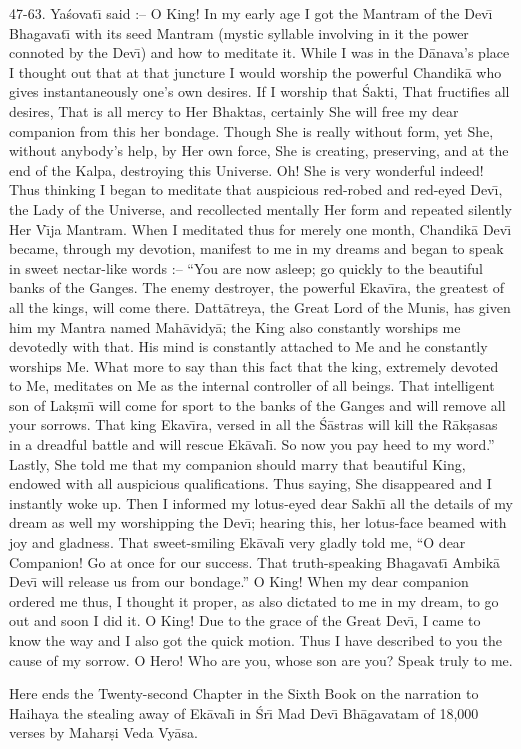 47-63. Ya\'sovat\={\i} said :-- O King! In my early age I got the Mantram of the Dev\={\i} Bhagavat\={\i} with its seed Mantram (mystic syllable involving in it the power connoted by the Dev\={\i}) and how to meditate it. While I was in the D\=anava's place I thought out that at that juncture I would worship the powerful Chandik\=a who gives instantaneously one's own desires. If I worship that \'Sakti, That fructifies all desires, That is all mercy to Her Bhaktas, certainly She will free my dear companion from this her bondage. Though She is really without form, yet She, without anybody's help, by Her own force, She is creating, preserving, and at the end of the Kalpa, destroying this Universe. Oh! She is very wonderful indeed! Thus thinking I began to meditate that auspicious red-robed and red-eyed Dev\={\i}, the Lady of the Universe, and recollected mentally Her form and repeated silently Her V\={\i}ja Mantram. When I meditated thus for merely one month, Chandik\=a Dev\={\i} became, through my devotion, manifest to me in my dreams and began to speak in sweet nectar-like words :-- ``You are now asleep; go quickly to the beautiful banks of the Ganges. The enemy destroyer, the powerful Ekav\={\i}ra, the greatest of all the kings, will come there. Datt\=atreya, the Great Lord of the Munis, has given him my Mantra named Mah\=avidy\=a; the King also constantly worships me devotedly with that. His mind is constantly attached to Me and he constantly worships Me. What more to say than this fact that the king, extremely devoted to Me, meditates on Me as the internal controller of all beings. That intelligent son of Lak\d{s}m\={\i} will come for sport to the banks of the Ganges and will remove all your sorrows. That king Ekav\={\i}ra, versed in all the \'S\=astras will kill the R\=ak\d{s}asas in a dreadful battle and will rescue Ek\=aval\={\i}. So now you pay heed to my word.'' Lastly, She told me that my companion should marry that beautiful King, endowed with all auspicious qualifications. Thus saying, She disappeared and I instantly woke up. Then I informed my lotus-eyed dear Sakh\={\i} all the details of my dream as well my worshipping the Dev\={\i}; hearing this, her lotus-face beamed with joy and gladness. That sweet-smiling Ek\=aval\={\i} very gladly told me, ``O dear Companion! Go at once for our success. That truth-speaking Bhagavat\={\i} Ambik\=a Dev\={\i} will release us from our bondage.'' O King! When my dear companion ordered me thus, I thought it proper, as also dictated to me in my dream, to go out and soon I did it. O King! Due to the grace of the Great Dev\={\i}, I came to know the way and I also got the quick motion. Thus I have described to you the cause of my sorrow. O Hero! Who are you, whose son are you? Speak truly to me.

Here ends the Twenty-second Chapter in the Sixth Book on the narration to Haihaya the stealing away of Ek\=aval\={\i} in \'Sr\={\i} Mad Dev\={\i} Bh\=agavatam of 18,000 verses by Mahar\d{s}i Veda Vy\=asa.



